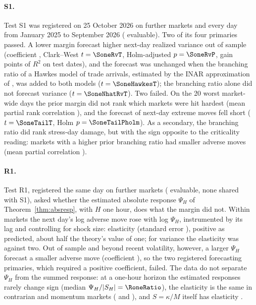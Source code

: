 \documentclass[12pt]{article}
\theoremstyle{definition}
\theoremstyle{remark}
\begin{document}
\paragraph{S1.} Test S1 was registered on 25 October 2026 on \SoneDrawn{} further markets and every day from January 2025 to September 2026 (\SoneSymbols{} evaluable). Two of its four primaries passed. A lower margin forecast higher next-day realized variance out of sample (coefficient \SoneRvCoef{}, Clark--West $t=\SoneRvT$, Holm-adjusted $p=\SoneRvP$, gain \SoneRvGain{} points of $R^2$ on \SoneDates{} test dates), and the forecast was unchanged when the branching ratio of a Hawkes model of trade arrivals, estimated by the INAR approximation of \citet{kirchner2016}, was added to both models ($t=\SoneHawkesT$); the branching ratio alone did not forecast variance ($t=\SoneNhatRvT$). Two failed. On the 20 worst market-wide days the prior margin did not rank which markets were hit hardest (mean partial rank correlation \SoneRho{}), and the forecast of next-day extreme moves fell short ($t=\SoneTailT$, Holm $p=\SoneTailPholm$). As a secondary, the branching ratio did rank stress-day damage, but with the sign opposite to the criticality reading: markets with a higher prior branching ratio had smaller adverse moves (mean partial correlation \SoneNhatStressRho{}).

\paragraph{R1.} Test R1, registered the same day on \RoneDrawn{} further markets (\RoneSymbols{} evaluable, none shared with S1), asked whether the estimated absolute response $\Psi_H$ of Theorem~\ref{thm:absresp}, with $H$ one hour, does what the margin did not. Within markets the next day's log adverse move rose with log $\Psi_H$, instrumented by its lag and controlling for shock size: elasticity \RoneElast{} (standard error \RoneElastSE{}), positive as predicted, about half the theory's value of one; for variance the elasticity was \RoneRv{} against two. Out of sample and beyond recent volatility, however, a larger $\Psi_H$ forecast a smaller adverse move (coefficient \RoneFcCoef{}), so the two registered forecasting primaries, which required a positive coefficient, failed. The data do not separate $\Psi_H$ from the summed response: at a one-hour horizon the estimated responses rarely change sign (median $\Psi_H/|S_H|=\RoneRatio$), the elasticity is the same in contrarian and momentum markets (\RoneContr{} and \RoneMom), and $S=\kappa/M$ itself has elasticity \RoneLogS{}.
\end{document}
